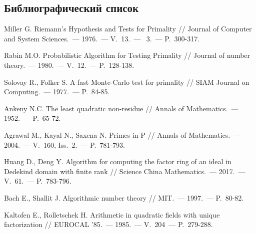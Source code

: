 \documentclass[_00_dissertation.tex]{subfiles}
\begin{document}

\renewcommand{\bibname}{Список использованных источников}

\begin{thebibliography}{99}
\section*{Библиографический список}
\vspace{-12pt}

    Miller G. Riemann's Hypothesis and Tests for Primality // Journal of Computer and System Sciences.~--- 1976.~--- V.~13.~--- ~3.~--- P.~300-317.

    Rabin M.O. Probabilistic Algorithm for Testing Primality // Journal of number theory.~--- 1980.~--- V.~12.~--- P.~128-138.

    Solovay R., Folker S. A fast Monte-Carlo test for primality // SIAM Journal on Computing.~--- 1977.~--- P.~84-85.

    Ankeny N.C. The least quadratic non-residue // Annals of Mathematics.~--- 1952.~--- P.~65-72.

    Agrawal M., Kayal N., Saxena N. Primes in P // Annals of Mathematics.~--- 2004.~--- V.~160, Iss.~2.~--- P.~781-793.

    Huang D., Deng Y. Algorithm for computing the factor ring of an ideal in Dedekind domain with finite rank // Science China Mathematics.~--- 2017.~--- V.~61.~--- P.~783-796.

    Bach E., Shallit J. Algorithmic number theory // MIT.~--- 1997.~--- P.~80-82.

    Kaltofen E., Rolletschek H. Arithmetic in quadratic fields with unique factorization // EUROCAL '85.~--- 1985.~--- V.~204~--- P.~279-288.


\end{thebibliography}
\end{document}
